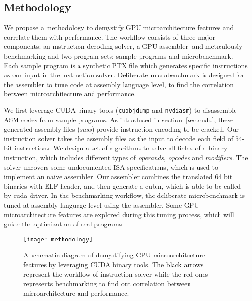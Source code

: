 \subsection{Methodology}


We propose a methodology to demystify GPU microarchitecture features and correlate them with performance.
The workflow consists of three major components: an instruction decoding solver, a GPU assembler, and meticulously
benchmarking %
and two program sets: sample programs and microbenchmark.
Each sample program is a synthetic PTX file which generates specific instructions as our input in the instruction
solver.%
Deliberate microbenchmark is designed for the assembler to tune code at assembly language level, to find the correlation between microarchitecture and performance.

We first leverage CUDA binary tools ({\tt cuobjdump} and {\tt nvdiasm}) to disassemble ASM codes from sample programs. %
As introduced in section~\ref{sec:cuda}, these generated assembly files ({\em sass}) provide instruction encoding to be cracked.
Our instruction solver takes the assembly files as the input to decode each field of 64-bit instructions.
We design a set of algorithms to solve all fields of a binary instruction, which includes different types of {\em operands}, {\em opcodes} and {\em modifiers}.
The solver uncovers some undocumented ISA specifications, which is used to implement an naive assembler.
Our assembler combines the translated 64 bit binaries with ELF header, and then generate a cubin, which is able to be called by cuda
driver.
In the benchmarking workflow, the deliberate microbenchmark is tuned at assembly language level using the assembler.
Some GPU microarchitecture features are explored during this tuning process, which will guide the optimization of real programs.


\begin{figure}[htbp]
\begin{center}
\texttt{[image: methodology]}
\caption{A schematic diagram of demystifying GPU microarchitecture features by leveraging CUDA binary tools. The black arrows
represent the workflow of instruction solver while the red ones represents benchmarking to find out correlation between microarchitecture
and performance.}
\label{fig:workflow}
\end{center}
\end{figure}


